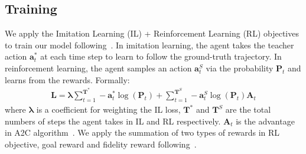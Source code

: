 \documentclass[sigconf]{acmart}
\begin{document}
\subsection{Training}
We apply the Imitation Learning (IL) + Reinforcement Learning (RL) objectives to train our model following~\cite{tan2019envdrop}. 
In imitation learning, the agent takes the teacher action $\mathbf{a}_t^*$ at each time step to learn to follow the ground-truth trajectory. 
In reinforcement learning, the agent samples an action $\mathbf{a}_t^S$ via the probability $\mathbf{P}_t$ and learns from the rewards. Formally:
\begin{align}
	\mathbf{L}=\mathbf{\lambda} \sum_{t=1}^{\mathbf{T}^*} -\mathbf{a}_t^*\log(\mathbf{P}_t) + \sum_{t=1}^{\mathbf{T}^S} -\mathbf{a}_t^S \log(\mathbf{P}_t) \mathbf{A}_t
\end{align}
where $\mathbf{\lambda}$ is a coefficient for weighting the IL loss, $\mathbf{T}^*$ and $\mathbf{T}^S$ are the total numbers of steps the agent takes in IL and RL respectively.
$\mathbf{A}_t$ is the advantage in A2C algorithm~\cite{volo2016a3c}. 
We apply the summation of two types of rewards in RL objective, goal reward and fidelity reward following~\cite{jain2019r4r}. 
\end{document}
